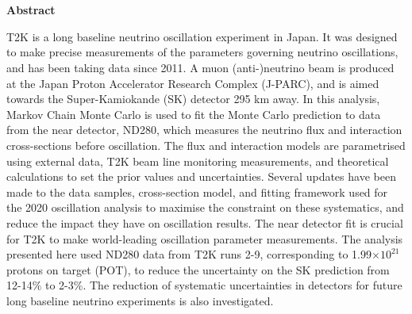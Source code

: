 \chapter{}

\begin{center}
\textbf{Abstract} 
\newline
\end{center}

T2K is a long baseline neutrino oscillation experiment in Japan. It was designed to make precise measurements of the parameters governing neutrino oscillations, and has been taking data since 2011. A muon (anti-)neutrino beam is produced at the Japan Proton Accelerator Research Complex (J-PARC), and is aimed towards the Super-Kamiokande (SK) detector 295 km away. In this analysis, Markov Chain Monte Carlo is used to fit the Monte Carlo prediction to data from the near detector, ND280, which measures the neutrino flux and interaction cross-sections before oscillation. The flux and interaction models are parametrised using external data, T2K beam line monitoring measurements, and theoretical calculations to set the prior values and uncertainties. Several updates have been made to the data samples, cross-section model, and fitting framework used for the 2020 oscillation analysis to maximise the constraint on these systematics, and reduce the impact they have on oscillation results. The near detector fit is crucial for T2K to make world-leading oscillation parameter measurements. The analysis presented here used ND280 data from T2K runs 2-9, corresponding to 1.99$\times10^{21}$ protons on target (POT), to reduce the uncertainty on the SK prediction from 12-14$\%$ to 2-3$\%$. The reduction of systematic uncertainties in detectors for future long baseline neutrino experiments is also investigated. 


\newpage
